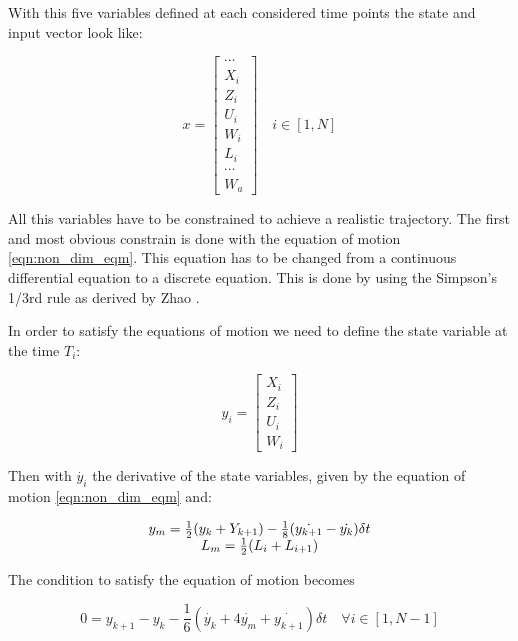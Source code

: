 \par With this five variables defined at each considered time points the state and input vector look like:

\begin{equation}
	x= 
	\begin{bmatrix}
		\cdots \\
		X_i \\
		Z_i \\
		U_i \\
		W_i \\
		L_i \\
		\cdots \\
		W_a
	\end{bmatrix}
	\quad i \in [1,N]
	\label{eqn:big_vector}
\end{equation}

\par All this variables have to be constrained to achieve a realistic trajectory.
The first and most obvious constrain is done with the equation of motion \ref{eqn:non_dim_eqm}.
This equation has to be changed from a continuous differential equation to a discrete equation.
This is done by using the Simpson's 1/3rd rule as derived by Zhao \cite{zhao2004optimal}.

In order to satisfy the equations of motion we need to define the state variable at the time $T_i$:

\begin{equation}
	y_i= \begin{bmatrix}
		X_i \\
		Z_i \\
		U_i \\
		W_i 
	\end{bmatrix}
	\label{eqn:state_i}
\end{equation}

Then with $\dot{y_i}$ the derivative of the state variables, given by the equation of motion \ref{eqn:non_dim_eqm} and:

\begin{equation}
	\begin{array}[c]{c}
		y_m= \frac{1}{2}(y_k + Y_{k+1}) - \frac{1}{8}(\dot{y_{k+1}} - \dot{y_k})\delta t \\
		L_m=\frac{1}{2}(L_i + L_{i+1})
	\end{array}
	\label{eqn:simpson_middle}
\end{equation}

The condition to satisfy the equation of motion becomes

\begin{equation}
	0=y_{k+1} - y_k - \frac{1}{6}( \dot{y_k} + 4 \dot{y_m} + \dot{y_{k+1}})\delta t \quad \forall i \in [1,N-1]
	\label{eqn:simpson}
\end{equation}

